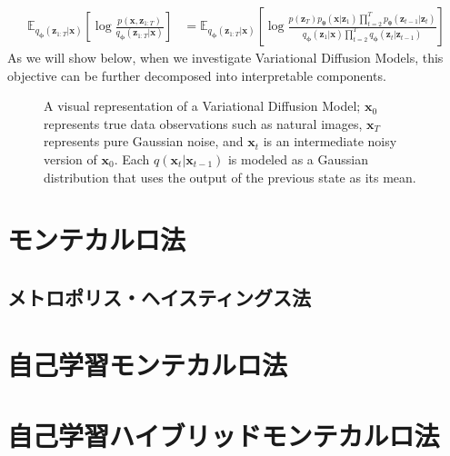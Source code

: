 \begin{align}
\mathbb{E}_{q_{\bm{\phi}}(\bm{z}_{1:T}|\bm{x})}\left[\log \frac{p(\bm{x}, \bm{z}_{1:T})}{q_{\bm{\phi}}(\bm{z}_{1:T}|\bm{x})}\right]
&= \mathbb{E}_{q_{\bm{\phi}}(\bm{z}_{1:T}|\bm{x})}\left[\log \frac{p(\bm{z}_T)p_{\bm{\theta}}(\bm{x}|\bm{z}_1)\prod_{t=2}^{T}p_{\bm{\theta}}(\bm{z}_{t-1}|\bm{z}_{t})}{q_{\bm{\phi}}(\bm{z}_1|\bm{x})\prod_{t=2}^{T}q_{\bm{\phi}}(\bm{z}_{t}|\bm{z}_{t-1})}\right]
\end{align}
As we will show below, when we investigate Variational Diffusion Models, this objective can be further decomposed into interpretable components.
\begin{figure}
  \centering
  \caption{A visual representation of a Variational Diffusion Model; $\bm{x}_0$ represents true data observations such as natural images, $\bm{x}_T$ represents pure Gaussian noise, and $\bm{x}_t$ is an intermediate noisy version of $\bm{x}_0$.  Each $q(\bm{x}_t|\bm{x}_{t-1})$ is modeled as a Gaussian distribution that uses the output of the previous state as its mean.}
  \label{fig:vdm}
\end{figure}

\section{モンテカルロ法}
\subsection{メトロポリス・ヘイスティングス法}


\section{自己学習モンテカルロ法}


\section{自己学習ハイブリッドモンテカルロ法}
